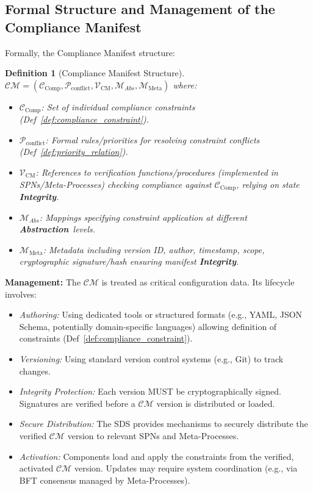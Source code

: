 \documentclass[12pt,a4paper]{report}
\newtheorem{definition}{Definition}[section]
\newcommand{\Integrity}{\textbf{Integrity}}
\newcommand{\Abstraction}{\textbf{Abstraction}}
\begin{document}
	\subsection{Formal Structure and Management of the Compliance Manifest} %
	\label{sec:5-2-1} %
	
	Formally, the Compliance Manifest structure:
	\begin{definition}[Compliance Manifest Structure]
		\label{def:compliance_manifest}
		$\mathcal{CM} = (\mathcal{C}_{\text{Comp}}, \mathcal{P}_{\text{conflict}}, \mathcal{V}_{\text{CM}}, \mathcal{M}_{Abs}, \mathcal{M}_{\text{Meta}})$ where:
		\begin{itemize}[noitemsep]
			\item $\mathcal{C}_{\text{Comp}}$: Set of individual compliance constraints (Def~\ref{def:compliance_constraint}).
			\item $\mathcal{P}_{\text{conflict}}$: Formal rules/priorities for resolving constraint conflicts (Def~\ref{def:priority_relation}).
			\item $\mathcal{V}_{\text{CM}}$: References to verification functions/procedures (implemented in SPNs/Meta-Processes) checking compliance against $\mathcal{C}_{\text{Comp}}$, relying on state \Integrity.
			\item $\mathcal{M}_{Abs}$: Mappings specifying constraint application at different \Abstraction\ levels.
			\item $\mathcal{M}_{\text{Meta}}$: Metadata including version ID, author, timestamp, scope, cryptographic signature/hash ensuring manifest \Integrity.
		\end{itemize}
	\end{definition}
	
	\textbf{Management:} The $\mathcal{CM}$ is treated as critical configuration data. Its lifecycle involves:
	\begin{itemize}
		\item \textit{Authoring:} Using dedicated tools or structured formats (e.g., YAML, JSON Schema, potentially domain-specific languages) allowing definition of constraints (Def~\ref{def:compliance_constraint}).
		\item \textit{Versioning:} Using standard version control systems (e.g., Git) to track changes.
		\item \textit{Integrity Protection:} Each version MUST be cryptographically signed. Signatures are verified before a $\mathcal{CM}$ version is distributed or loaded.
		\item \textit{Secure Distribution:} The SDS provides mechanisms to securely distribute the verified $\mathcal{CM}$ version to relevant SPNs and Meta-Processes.
		\item \textit{Activation:} Components load and apply the constraints from the verified, activated $\mathcal{CM}$ version. Updates may require system coordination (e.g., via BFT consensus managed by Meta-Processes).
	\end{itemize}
	
\end{document}
